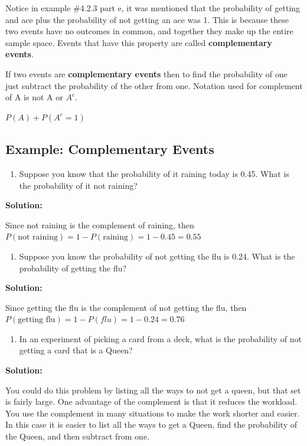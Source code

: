 \documentclass[
]{book}
\providecommand{\tightlist}{%
  \setlength{\itemsep}{0pt}\setlength{\parskip}{0pt}}
\begin{document}
Notice in example \#4.2.3 part e, it was mentioned that the probability of getting and ace plus the probability of not getting an ace was 1. This is because these two events have no outcomes in common, and together they make up the entire sample space. Events that have this property are called \textbf{complementary events}.

If two events are \textbf{complementary events} then to find the probability of one just subtract the probability of the other from one. Notation used for complement of A is not A or \(A^{c}\).

\(P(A)+P(A^{c}=1)\)

\hypertarget{example-complementary-events}{%
\subsection{Example: Complementary Events}\label{example-complementary-events}}

\begin{enumerate}
\def\labelenumi{\alph{enumi}.}
\tightlist
\item
  Suppose you know that the probability of it raining today is 0.45. What is the probability of it not raining?
\end{enumerate}

\textbf{Solution:}

Since not raining is the complement of raining, then \(P(\text{not raining})=1-P(\text{raining}) = 1-0.45=0.55\)

\begin{enumerate}
\def\labelenumi{\alph{enumi}.}
\setcounter{enumi}{1}
\tightlist
\item
  Suppose you know the probability of not getting the flu is 0.24. What is the probability of getting the flu?
\end{enumerate}

\textbf{Solution:}

Since getting the flu is the complement of not getting the flu, then \(P(\text{getting flu})=1-P(flu)=1-0.24=0.76\)

\begin{enumerate}
\def\labelenumi{\alph{enumi}.}
\setcounter{enumi}{2}
\tightlist
\item
  In an experiment of picking a card from a deck, what is the probability of not getting a card that is a Queen?
\end{enumerate}

\textbf{Solution:}

You could do this problem by listing all the ways to not get a queen, but that set is fairly large. One advantage of the complement is that it reduces the workload. You use the complement in many situations to make the work shorter and easier. In this case it is easier to list all the ways to get a Queen, find the probability of the Queen, and then subtract from one.
\end{document}
